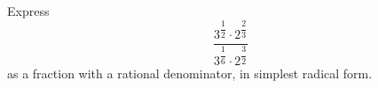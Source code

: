Express
\[\dfrac{3^{\dfrac{1}{2}}\cdot2^{\dfrac{2}{3}}}{3^{\dfrac{1}{6}}\cdot2^{\dfrac{3}{2}}}\]
as a fraction with a rational denominator, in simplest radical form.
